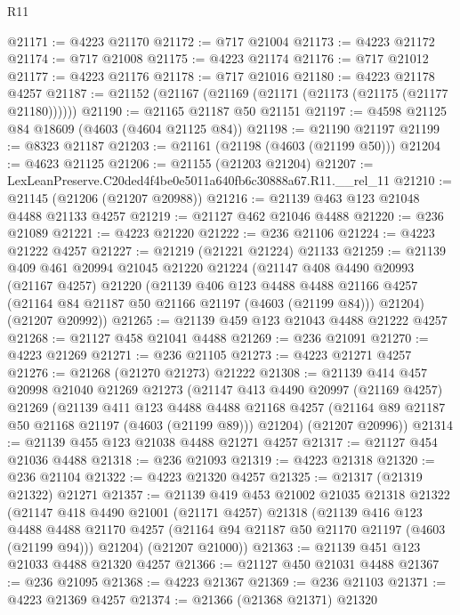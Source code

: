 \begin{lexlean}{R11}
\begin{coremodule}
@21171 := @4223 @21170
@21172 := @717 @21004
@21173 := @4223 @21172
@21174 := @717 @21008
@21175 := @4223 @21174
@21176 := @717 @21012
@21177 := @4223 @21176
@21178 := @717 @21016
@21180 := @4223 @21178 @4257
@21187 := @21152 (@21167 (@21169 (@21171 (@21173 (@21175 (@21177 @21180))))))
@21190 := @21165 @21187 @50 @21151
@21197 := @4598 @21125 @84 @18609 (@4603 (@4604 @21125 @84))
@21198 := @21190 @21197
@21199 := @8323 @21187
@21203 := @21161 (@21198 (@4603 (@21199 @50)))
@21204 := @4623 @21125
@21206 := @21155 (@21203 @21204)
@21207 := LexLeanPreserve.C20ded4f4be0e5011a640fb6c30888a67.R11.__rel_11
@21210 := @21145 (@21206 (@21207 @20988))
@21216 := @21139 @463 @123 @21048 @4488 @21133 @4257
@21219 := @21127 @462 @21046 @4488
@21220 := @236 @21089
@21221 := @4223 @21220
@21222 := @236 @21106
@21224 := @4223 @21222 @4257
@21227 := @21219 (@21221 @21224) @21133
@21259 := @21139
    @409
    @461
    @20994
    @21045
    @21220
    @21224
    (@21147
      @408
      @4490
      @20993
      (@21167 @4257)
      @21220
      (@21139
        @406
        @123
        @4488
        @4488
        @21166
        @4257
        (@21164 @84 @21187 @50 @21166 @21197 (@4603 (@21199 @84)))
        @21204)
      (@21207 @20992))
@21265 := @21139 @459 @123 @21043 @4488 @21222 @4257
@21268 := @21127 @458 @21041 @4488
@21269 := @236 @21091
@21270 := @4223 @21269
@21271 := @236 @21105
@21273 := @4223 @21271 @4257
@21276 := @21268 (@21270 @21273) @21222
@21308 := @21139
    @414
    @457
    @20998
    @21040
    @21269
    @21273
    (@21147
      @413
      @4490
      @20997
      (@21169 @4257)
      @21269
      (@21139
        @411
        @123
        @4488
        @4488
        @21168
        @4257
        (@21164 @89 @21187 @50 @21168 @21197 (@4603 (@21199 @89)))
        @21204)
      (@21207 @20996))
@21314 := @21139 @455 @123 @21038 @4488 @21271 @4257
@21317 := @21127 @454 @21036 @4488
@21318 := @236 @21093
@21319 := @4223 @21318
@21320 := @236 @21104
@21322 := @4223 @21320 @4257
@21325 := @21317 (@21319 @21322) @21271
@21357 := @21139
    @419
    @453
    @21002
    @21035
    @21318
    @21322
    (@21147
      @418
      @4490
      @21001
      (@21171 @4257)
      @21318
      (@21139
        @416
        @123
        @4488
        @4488
        @21170
        @4257
        (@21164 @94 @21187 @50 @21170 @21197 (@4603 (@21199 @94)))
        @21204)
      (@21207 @21000))
@21363 := @21139 @451 @123 @21033 @4488 @21320 @4257
@21366 := @21127 @450 @21031 @4488
@21367 := @236 @21095
@21368 := @4223 @21367
@21369 := @236 @21103
@21371 := @4223 @21369 @4257
@21374 := @21366 (@21368 @21371) @21320

\end{coremodule}
\end{lexlean}

